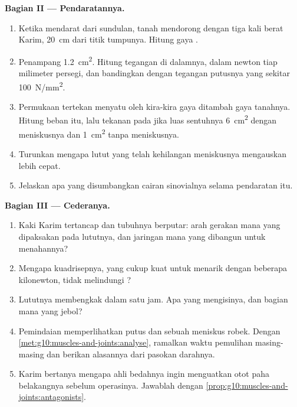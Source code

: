 \begin{problem}
\medskip
\noindent\textbf{Bagian II --- Pendaratannya.}
\begin{enumerate}[resume]
  \item Ketika mendarat dari sundulan, tanah mendorong dengan tiga kali
        berat Karim, \qty{20}{cm} dari titik tumpunya. Hitung gaya
        .
  \item Penampang  \qty{1.2}{cm^2}. Hitung tegangan di
        dalamnya, dalam newton tiap milimeter persegi, dan bandingkan
        dengan tegangan putusnya yang sekitar \qty{100}{N/mm^2}.
  \item Permukaan  tertekan menyatu oleh kira-kira gaya
         ditambah gaya tanahnya. Hitung beban itu, lalu
        tekanan pada  jika luas sentuhnya \qty{6}{cm^2}
        dengan meniskusnya dan \qty{1}{cm^2} tanpa meniskusnya.
  \item Turunkan mengapa lutut yang telah kehilangan meniskusnya
        mengauskan  lebih cepat.
  \item Jelaskan apa yang disumbangkan cairan sinovialnya selama
        pendaratan itu.
\end{enumerate}

\medskip
\noindent\textbf{Bagian III --- Cederanya.}
\begin{enumerate}[resume]
  \item Kaki Karim tertancap dan tubuhnya berputar: arah gerakan mana
        yang dipaksakan pada lututnya, dan jaringan mana yang dibangun
        untuk menahannya?
  \item Mengapa kuadrisepnya, yang cukup kuat untuk menarik dengan
        beberapa kilonewton, tidak melindungi ?
  \item Lututnya membengkak dalam satu jam. Apa yang mengisinya, dan
        bagian  mana yang jebol?
  \item Pemindaian memperlihatkan  putus dan sebuah meniskus
        robek. Dengan \cref{met:g10:muscles-and-joints:analyse},
        ramalkan waktu pemulihan masing-masing dan berikan alasannya
        dari pasokan darahnya.
  \item Karim bertanya mengapa ahli bedahnya ingin menguatkan otot paha
        belakangnya sebelum operasinya. Jawablah dengan
        \cref{prop:g10:muscles-and-joints:antagonists}.
\end{enumerate}


\end{problem}
